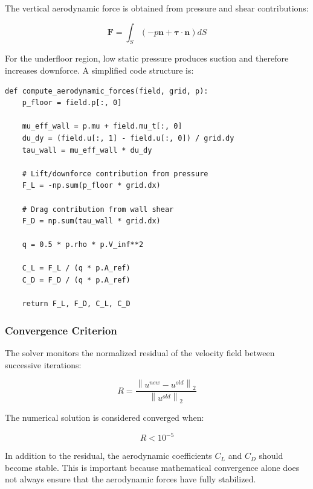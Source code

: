 \documentclass[12pt,a4paper]{article}
\begin{document}
The vertical aerodynamic force is obtained from pressure and shear contributions:

\begin{equation}
    \bm{F}=\int_S\left(-p\bm{n}+\bm{\tau}\cdot\bm{n}\right)dS
\end{equation}

For the underfloor region, low static pressure produces suction and therefore increases
downforce. A simplified code structure is:

\begin{lstlisting}[style=cleanPython, caption={Simplified aerodynamic-force integration.}]
def compute_aerodynamic_forces(field, grid, p):
    p_floor = field.p[:, 0]

    mu_eff_wall = p.mu + field.mu_t[:, 0]
    du_dy = (field.u[:, 1] - field.u[:, 0]) / grid.dy
    tau_wall = mu_eff_wall * du_dy

    # Lift/downforce contribution from pressure
    F_L = -np.sum(p_floor * grid.dx)

    # Drag contribution from wall shear
    F_D = np.sum(tau_wall * grid.dx)

    q = 0.5 * p.rho * p.V_inf**2

    C_L = F_L / (q * p.A_ref)
    C_D = F_D / (q * p.A_ref)

    return F_L, F_D, C_L, C_D
\end{lstlisting}

\subsubsection{Convergence Criterion}

The solver monitors the normalized residual of the velocity field between successive
iterations:

\begin{equation}
    R =\frac{\left\|u^{new}-u^{old}\right\|_2}{\left\|u^{old}\right\|_2}
\end{equation}

The numerical solution is considered converged when:

\begin{equation}
    R < 10^{-5}
\end{equation}

In addition to the residual, the aerodynamic coefficients $C_L$ and $C_D$ should become
stable. This is important because mathematical convergence alone does not always ensure
that the aerodynamic forces have fully stabilized.
\end{document}
